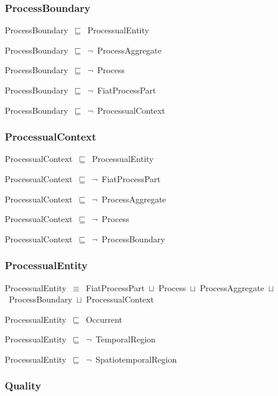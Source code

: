 \documentclass{article}
\begin{document}
\subsubsection*{ProcessBoundary}

ProcessBoundary~\ensuremath{\sqsubseteq}~ProcessualEntity~

ProcessBoundary~\ensuremath{\sqsubseteq}~\ensuremath{\lnot}~ProcessAggregate

ProcessBoundary~\ensuremath{\sqsubseteq}~\ensuremath{\lnot}~Process

ProcessBoundary~\ensuremath{\sqsubseteq}~\ensuremath{\lnot}~FiatProcessPart

ProcessBoundary~\ensuremath{\sqsubseteq}~\ensuremath{\lnot}~ProcessualContext

\subsubsection*{ProcessualContext}

ProcessualContext~\ensuremath{\sqsubseteq}~ProcessualEntity~

ProcessualContext~\ensuremath{\sqsubseteq}~\ensuremath{\lnot}~FiatProcessPart

ProcessualContext~\ensuremath{\sqsubseteq}~\ensuremath{\lnot}~ProcessAggregate

ProcessualContext~\ensuremath{\sqsubseteq}~\ensuremath{\lnot}~Process

ProcessualContext~\ensuremath{\sqsubseteq}~\ensuremath{\lnot}~ProcessBoundary

\subsubsection*{ProcessualEntity}

ProcessualEntity~\ensuremath{\equiv}~FiatProcessPart~\ensuremath{\sqcup}~Process~\ensuremath{\sqcup}~ProcessAggregate~\ensuremath{\sqcup}~ProcessBoundary~\ensuremath{\sqcup}~ProcessualContext

ProcessualEntity~\ensuremath{\sqsubseteq}~Occurrent~

ProcessualEntity~\ensuremath{\sqsubseteq}~\ensuremath{\lnot}~TemporalRegion

ProcessualEntity~\ensuremath{\sqsubseteq}~\ensuremath{\lnot}~SpatiotemporalRegion

\subsubsection*{Quality}
\end{document}
